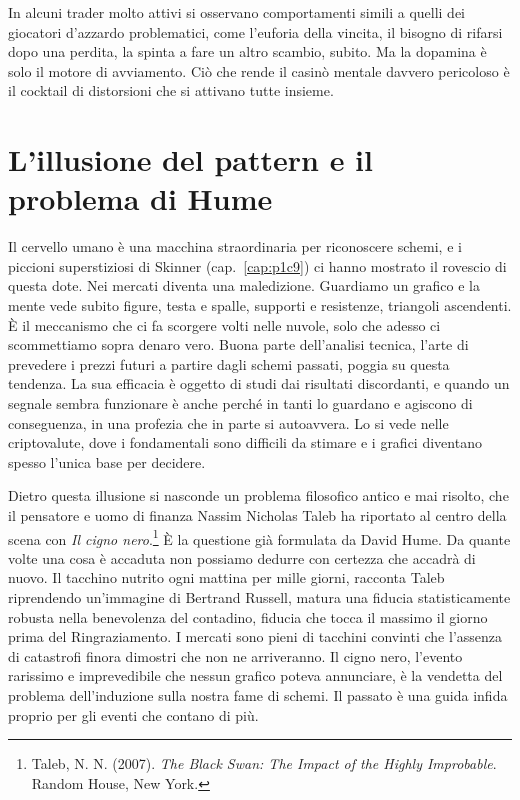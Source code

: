 In alcuni trader molto attivi si osservano comportamenti simili a quelli dei giocatori d'azzardo problematici, come l'euforia della vincita, il bisogno di rifarsi dopo una perdita, la spinta a fare un altro scambio, subito. Ma la dopamina \`{e} solo il motore di avviamento. Ci\`{o} che rende il casin\`{o} mentale davvero pericoloso \`{e} il cocktail di distorsioni che si attivano tutte insieme.

\section{L'illusione del pattern e il problema di Hume}
\label{sec:p2c14-pattern}

Il cervello umano \`{e} una macchina straordinaria per riconoscere schemi, e i piccioni superstiziosi di Skinner (cap.~\ref{cap:p1c9}) ci hanno mostrato il rovescio di questa dote. Nei mercati diventa una maledizione. Guardiamo un grafico e la mente vede subito figure, testa e spalle, supporti e resistenze, triangoli ascendenti. \`{E} il meccanismo che ci fa scorgere volti nelle nuvole, solo che adesso ci scommettiamo sopra denaro vero. Buona parte dell'analisi tecnica, l'arte di prevedere i prezzi futuri a partire dagli schemi passati, poggia su questa tendenza. La sua efficacia \`{e} oggetto di studi dai risultati discordanti, e quando un segnale sembra funzionare \`{e} anche perch\'{e} in tanti lo guardano e agiscono di conseguenza, in una profezia che in parte si autoavvera. Lo si vede nelle criptovalute, dove i fondamentali sono difficili da stimare e i grafici diventano spesso l'unica base per decidere.

Dietro questa illusione si nasconde un problema filosofico antico e mai risolto, che il pensatore e uomo di finanza Nassim Nicholas Taleb ha riportato al centro della scena con \textit{Il cigno nero}.\footnote{Taleb, N. N. (2007). \textit{The Black Swan: The Impact of the Highly Improbable}. Random House, New York.} \`{E} la questione gi\`{a} formulata da David Hume. Da quante volte una cosa \`{e} accaduta non possiamo dedurre con certezza che accadr\`{a} di nuovo. Il tacchino nutrito ogni mattina per mille giorni, racconta Taleb riprendendo un'immagine di Bertrand Russell, matura una fiducia statisticamente robusta nella benevolenza del contadino, fiducia che tocca il massimo il giorno prima del Ringraziamento. I mercati sono pieni di tacchini convinti che l'assenza di catastrofi finora dimostri che non ne arriveranno. Il cigno nero, l'evento rarissimo e imprevedibile che nessun grafico poteva annunciare, \`{e} la vendetta del problema dell'induzione sulla nostra fame di schemi. Il passato \`{e} una guida infida proprio per gli eventi che contano di pi\`{u}.

